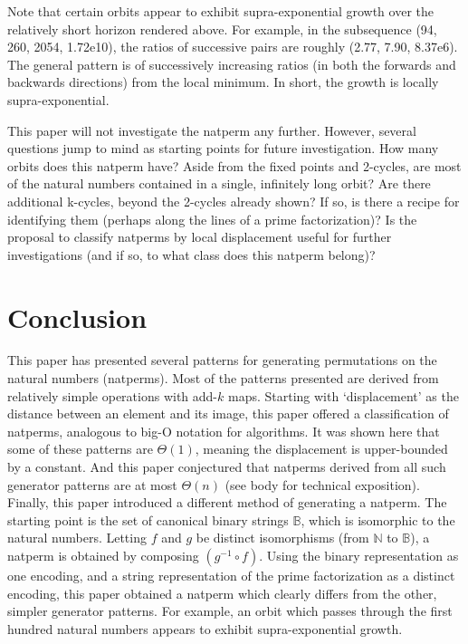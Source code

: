 \documentclass[12pt,reqno]{article}
\begin{document}
Note that certain orbits appear to exhibit supra-exponential growth over the relatively short horizon rendered above. For example, in the subsequence (94, 260, 2054, 1.72e10), the ratios of successive pairs are roughly (2.77, 7.90, 8.37e6). The general pattern is of successively increasing ratios (in both the forwards and backwards directions) from the local minimum. In short, the growth is locally supra-exponential.

This paper will not investigate the natperm any further. However, several questions jump to mind as starting points for future investigation. How many orbits does this natperm have? Aside from the fixed points and 2-cycles, are most of the natural numbers contained in a single, infinitely long orbit? Are there additional k-cycles, beyond the 2-cycles already shown? If so, is there a recipe for identifying them (perhaps along the lines of a prime factorization)? Is the proposal to classify natperms by local displacement useful for further investigations (and if so, to what class does this natperm belong)?

\section{Conclusion}

This paper has presented several patterns for generating permutations on the natural numbers (natperms). Most of the patterns presented are derived from relatively simple operations with add-$k$ maps. Starting with `displacement' as the distance between an element and its image, this paper offered a classification of natperms, analogous to big-O notation for algorithms. It was shown here that some of these patterns are $\Theta(1)$, meaning the displacement is upper-bounded by a constant. And this paper conjectured that natperms derived from all such generator patterns are at most $\Theta(n)$ (see body for technical exposition). Finally, this paper introduced a different method of generating a natperm. The starting point is the set of canonical binary strings $\mathbb{B}$, which is isomorphic to the natural numbers. Letting $f$ and $g$ be distinct isomorphisms (from $\mathbb{N}$ to $\mathbb{B}$), a natperm is obtained by composing $(g^{-1} \circ f)$. Using the binary representation as one encoding, and a string representation of the prime factorization as a distinct encoding, this paper obtained a natperm which clearly differs from the other, simpler generator patterns. For example, an orbit which passes through the first hundred natural numbers appears to exhibit supra-exponential growth. 
\end{document}
